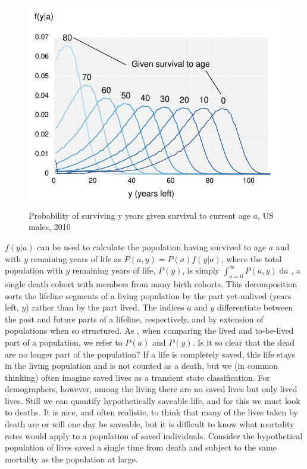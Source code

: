 \documentclass{article}
\newcommand{\dd}{\; \mathrm{d}}
\begin{document}
 \begin{figure}[h]
\centering
	\caption{Probability of surviving y years given survival to current age $a$, US
	males, 2010}
	\label{fig:fya}
	\includegraphics[scale=.8]{Figures/fya.pdf}	
\end{figure}

$f(y|a)$ can be used to calculate the population having survived to age $a$ and
with $y$ remaining years of life as $P(a,y) = P(a)f(y|a)$, where the total
population with $y$ remaining years of life, $P(y)$, is simply $\int
_{a=0}^\infty P(a,y) \dd a$ \citep{brouard1986structure, brouard1989mouvements},
a single death cohort with members from many birth cohorts. This decomposition sorts the lifeline segments of a living population
by the part yet-unlived (years left, $y$) rather than by the part lived. 
The indices $a$ and $y$ differentiate between the past and future
parts of a lifeline, respectively, and by extension of populations when
so structured. As \citet{brouard1986structure}, when comparing the lived and
to-be-lived part of a population, we refer to $P(a)$ and $P(y)$.
Is it so clear that the dead are no longer part of the population? If a life is
completely saved, this life stays in the living population and is not counted
as a death, but we (in common thinking) often imagine saved lives as a transient
state classification.
For demographers, however, among the living there
are no saved lives but only lived lives. Still we can quantify
hypothetically saveable life, and for this we must look to deaths.
It is nice, and often realistic, to think that many of the lives taken by death
are or will one day be saveable, but it is difficult to know what mortality
rates would apply to a population of saved individuals. Consider
the hypothetical population of lives saved a single time from death and subject to
the same mortality as the population at large.
\end{document}
